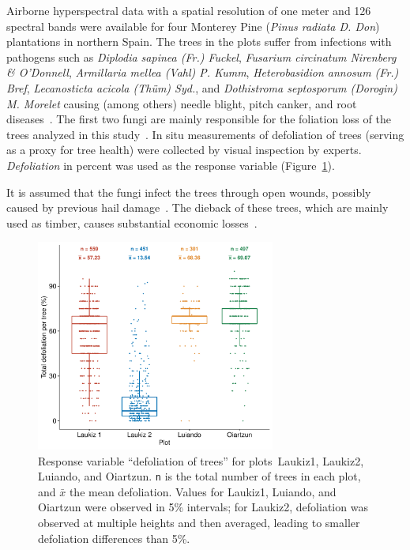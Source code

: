 \documentclass[remotesensing,article,accept,moreauthors,pdftex]{Definitions/mdpi}
\begin{document}
Airborne hyperspectral data with a spatial resolution of one meter and 126 spectral bands were available for four Monterey Pine (\textit{Pinus radiata D. Don}) plantations in northern Spain.
The trees in the plots suffer from infections with pathogens such as \textit{Diplodia sapinea (Fr.) Fuckel}, \textit{Fusarium circinatum Nirenberg \& O'Donnell}, \textit{Armillaria mellea (Vahl) P. Kumm}, \textit{Heterobasidion annosum (Fr.) Bref}, \textit{Lecanosticta acicola (Thüm) Syd.}, and \textit{Dothistroma septosporum (Dorogin) M. Morelet} causing (among others) needle blight, pitch canker, and root diseases~\cite{mesanza2016, iturritxa2017}.
The first two fungi are mainly responsible for the foliation loss of the trees analyzed in this study~\cite{iturritxa2014}.
In situ measurements of defoliation of trees (serving as a proxy for tree health) were collected by visual inspection by experts. \textit{Defoliation} in percent was used as the response variable (Figure~\ref{fig:defol-distr}).

It is assumed that the fungi infect the trees through open wounds, possibly caused by previous hail damage~\cite{iturritxa2014}.
The dieback of these trees, which are mainly used as timber, causes substantial economic losses~\cite{ganley2009}.

\begin{figure}[H]
		\includegraphics[width=0.7\textwidth] {defoliation-distribution-plot-1.pdf}
		\caption{Response variable ``defoliation of trees'' for plots~Laukiz1, Laukiz2, Luiando, and Oiartzun. \texttt{n} is the total number of trees in each plot, and $\bar{x}$ the mean defoliation. Values for Laukiz1, Luiando, and Oiartzun were observed in 5\% intervals; for Laukiz2, defoliation was observed at multiple heights and then averaged, leading to smaller defoliation differences than 5\%.}\label{fig:defol-distr}
\end{figure}
\end{document}
